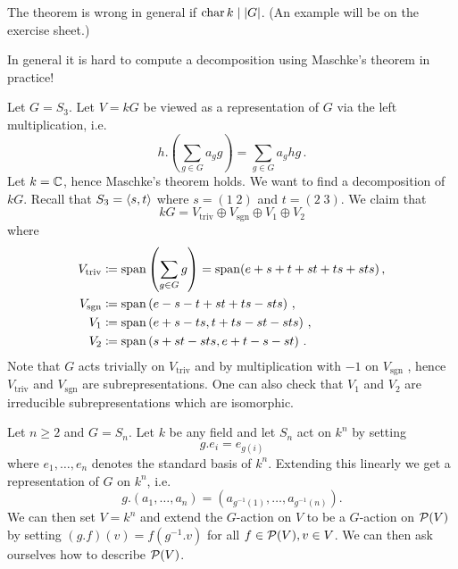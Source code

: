 \begin{warning}
  The theorem is wrong in general if $\operatorname{char} k \mid |G|$.
  (An example will be on the exercise sheet.)
\end{warning}

\begin{example}
  In general it is hard to compute a decomposition using Maschke’s theorem in practice!
  
  Let $G = S_3$.
  Let $V = kG$ be viewed as a representation of $G$ via the left multiplication, i.e.\
  \[
      h.\left( \sum_{g \in G} a_g g \right)
    = \sum_{g \in G} a_g hg \,.
  \]
  Let $k = \mathbb{C}$, hence Maschke’s theorem holds. We want to find a decomposition of $kG$. Recall that $S_3 = \left\langle s,t \right\rangle$ where $s = (1 \; 2)$ and $t = (2 \; 3)$. We claim that
  \[
      kG
    = V_{\text{triv}} \oplus V_{\text{sgn}} \oplus V_1 \oplus V_2
  \]
  where
  \begin{align*}
                V_{\text{triv}}
    &\coloneqq  \operatorname{span}\left(\sum_{g \in G} g \right) = \operatorname{span}(e+s+t+st+ts+sts) \,,
    \\
                V_{\text{sgn}}
    &\coloneqq  \operatorname{span}\left(e-s-t+st+ts-sts\right) \,,
    \\
                V_1
    &\coloneqq  \operatorname{span}\left(e+s-ts, t+ts-st-sts\right) \,,
    \\
                V_2
    &\coloneqq  \operatorname{span}\left(s+st-sts,e+t-s-st\right) \,.
  \end{align*}
  Note that $G$ acts trivially on $V_{\text{triv}}$ and by multiplication with $-1$ on $V_{\text{sgn}}$ , hence $V_{\text{triv}}$ and $V_{\text{sgn}}$ are subrepresentations.
  One can also check that $V_1$ and $V_2$ are irreducible subrepresentations which are isomorphic.
\end{example}


\begin{example}
  Let $n \geq 2$ and $G = S_n$.
  Let $k$ be any field and let $S_n$ act on $k^n$ by setting
  \[
      g.e_i
    = e_{g(i)}
  \]
  where $e_1, \dotsc, e_n$ denotes the standard basis of $k^n$.
  Extending this linearly we get a representation of $G$ on $k^n$, i.e.\
  \[
    g.(a_1, \dotsc, a_n)
    = \left( a_{g^{-1}(1)}, \dotsc, a_{g^{-1}(n)} \right).
  \]
  We can then set $V = k^n$ and extend the $G$-action on $V$ to be a $G$-action on $\mathcal{P}(V)$ by setting $(g.f)(v) = f(g^{-1}.v)$ for all $f \in \mathcal{P}(V), v \in V$.
  We can then ask ourselves how to describe $\mathcal{P}(V)$.
\end{example}


